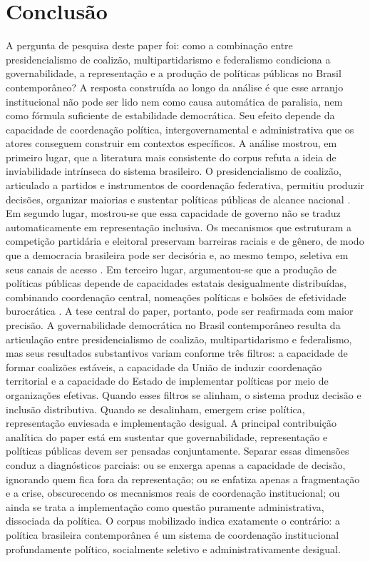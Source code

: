 \documentclass[12pt,a4paper]{article}
\begin{document}
\section{Conclusão}
\label{sec:org807230a}
A pergunta de pesquisa deste paper foi: como a combinação entre presidencialismo de coalizão, multipartidarismo e federalismo condiciona a governabilidade, a representação e a produção de políticas públicas no Brasil contemporâneo? A resposta construída ao longo da análise é que esse arranjo institucional não pode ser lido nem como causa automática de paralisia, nem como fórmula suficiente de estabilidade democrática. Seu efeito depende da capacidade de coordenação política, intergovernamental e administrativa que os atores conseguem construir em contextos específicos.
A análise mostrou, em primeiro lugar, que a literatura mais consistente do corpus refuta a ideia de inviabilidade intrínseca do sistema brasileiro. O presidencialismo de coalizão, articulado a partidos e instrumentos de coordenação federativa, permitiu produzir decisões, organizar maiorias e sustentar políticas públicas de alcance nacional \parencite{palermo2000_como_se,limongi2017_a_crise,oliveira2019_momentos_da}. Em segundo lugar, mostrou-se que essa capacidade de governo não se traduz automaticamente em representação inclusiva. Os mecanismos que estruturam a competição partidária e eleitoral preservam barreiras raciais e de gênero, de modo que a democracia brasileira pode ser decisória e, ao mesmo tempo, seletiva em seus canais de acesso \parencite{campos2017_o_que,sacchet2018_why_gender,gatto2025_resistance_to}. Em terceiro lugar, argumentou-se que a produção de políticas públicas depende de capacidades estatais desigualmente distribuídas, combinando coordenação central, nomeações políticas e bolsões de efetividade burocrática \parencite{panizza2022_the_politics,guy2022_bringing_political,mcdonnell2020_patchwork_leviathan}.
A tese central do paper, portanto, pode ser reafirmada com maior precisão. A governabilidade democrática no Brasil contemporâneo resulta da articulação entre presidencialismo de coalizão, multipartidarismo e federalismo, mas seus resultados substantivos variam conforme três filtros: a capacidade de formar coalizões estáveis, a capacidade da União de induzir coordenação territorial e a capacidade do Estado de implementar políticas por meio de organizações efetivas. Quando esses filtros se alinham, o sistema produz decisão e inclusão distributiva. Quando se desalinham, emergem crise política, representação enviesada e implementação desigual.
A principal contribuição analítica do paper está em sustentar que governabilidade, representação e políticas públicas devem ser pensadas conjuntamente. Separar essas dimensões conduz a diagnósticos parciais: ou se enxerga apenas a capacidade de decisão, ignorando quem fica fora da representação; ou se enfatiza apenas a fragmentação e a crise, obscurecendo os mecanismos reais de coordenação institucional; ou ainda se trata a implementação como questão puramente administrativa, dissociada da política. O corpus mobilizado indica exatamente o contrário: a política brasileira contemporânea é um sistema de coordenação institucional profundamente político, socialmente seletivo e administrativamente desigual.
\end{document}
